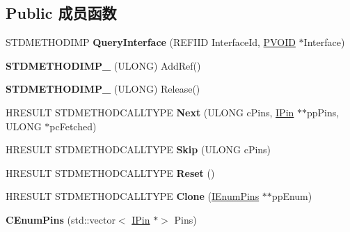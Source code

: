 \subsection*{Public 成员函数}
\begin{DoxyCompactItemize}
\item 
\mbox{\label{class_c_enum_pins_af9232ed59cc58a9aa4fbc99e120cc03b}} 
S\+T\+D\+M\+E\+T\+H\+O\+D\+I\+MP {\bfseries Query\+Interface} (R\+E\+F\+I\+ID Interface\+Id, \hyperlink{interfacevoid}{P\+V\+O\+ID} $\ast$Interface)
\item 
\mbox{\label{class_c_enum_pins_a895fd16286e53997c429c71211f64f24}} 
{\bfseries S\+T\+D\+M\+E\+T\+H\+O\+D\+I\+M\+P\+\_\+} (U\+L\+O\+NG) Add\+Ref()
\item 
\mbox{\label{class_c_enum_pins_a0e851c12c2ee6683a348f3dcfcb2a562}} 
{\bfseries S\+T\+D\+M\+E\+T\+H\+O\+D\+I\+M\+P\+\_\+} (U\+L\+O\+NG) Release()
\item 
\mbox{\label{class_c_enum_pins_ac1ddd9b120ec828e53bc60140f5c284a}} 
H\+R\+E\+S\+U\+LT S\+T\+D\+M\+E\+T\+H\+O\+D\+C\+A\+L\+L\+T\+Y\+PE {\bfseries Next} (U\+L\+O\+NG c\+Pins, \hyperlink{interface_i_pin}{I\+Pin} $\ast$$\ast$pp\+Pins, U\+L\+O\+NG $\ast$pc\+Fetched)
\item 
\mbox{\label{class_c_enum_pins_ad1bf82f6964f8777c9ee7bd7614c219d}} 
H\+R\+E\+S\+U\+LT S\+T\+D\+M\+E\+T\+H\+O\+D\+C\+A\+L\+L\+T\+Y\+PE {\bfseries Skip} (U\+L\+O\+NG c\+Pins)
\item 
\mbox{\label{class_c_enum_pins_a6b3159b1648229c63cf95d33f2eefb60}} 
H\+R\+E\+S\+U\+LT S\+T\+D\+M\+E\+T\+H\+O\+D\+C\+A\+L\+L\+T\+Y\+PE {\bfseries Reset} ()
\item 
\mbox{\label{class_c_enum_pins_aae23ca6b8bcabb0a0da2742ad35dd8fc}} 
H\+R\+E\+S\+U\+LT S\+T\+D\+M\+E\+T\+H\+O\+D\+C\+A\+L\+L\+T\+Y\+PE {\bfseries Clone} (\hyperlink{interface_i_enum_pins}{I\+Enum\+Pins} $\ast$$\ast$pp\+Enum)
\item 
\mbox{\label{class_c_enum_pins_a233ea7c509590f5897040ac9f0984ffd}} 
{\bfseries C\+Enum\+Pins} (std\+::vector$<$ \hyperlink{interface_i_pin}{I\+Pin} $\ast$$>$ Pins)
$$
\end{DoxyCompactItemize}
